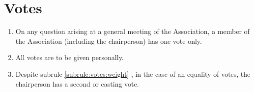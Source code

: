 \section{Votes}
\label{rule:votes}

\begin{enumerate}
	\item \label{subrule:votes:weight} On any question arising at a general meeting of the Association, a member of the Association (including the chairperson) has one vote only.
	\item All votes are to be given personally.
	\item Despite subrule \ref{subrule:votes:weight} , in the case of an equality of votes, the chairperson has a second or casting vote.
\end{enumerate}